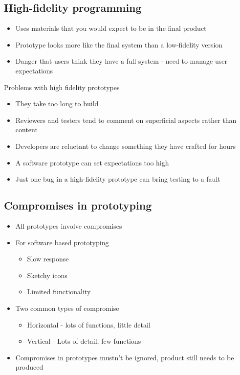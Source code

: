 \documentclass{article}[18pt]
\begin{document}
\subsection{High-fidelity programming}
\begin{itemize}
	\item Uses materials that you would expect to be in the final product
	\item Prototype looks more like the final system than a low-fidelity version
	\item Danger that users think they have a full system - need to manage user expectations
\end{itemize}
Problems with high fidelity prototypes
\begin{itemize}
	\item They take too long to build
	\item Reviewers and testers tend to comment on superficial aspects rather than content
	\item Developers are reluctant to change something they have crafted for hours
	\item A software prototype can set expectations too high
	\item Just one bug in a high-fidelity prototype can bring testing to a fault
\end{itemize}
\subsection{Compromises in prototyping}
\begin{itemize}
	\item All prototypes involve compromises
	\item For software based prototyping
	\begin{itemize}
		\item Slow response
		\item Sketchy icons
		\item Limited functionality
	\end{itemize}
	\item Two common types of compromise
	\begin{itemize}
		\item Horizontal - lots of functions, little detail
		\item Vertical - Lots of detail, few functions
	\end{itemize}
	\item Compromises in prototypes mustn't be ignored, product still needs to be produced
\end{itemize}
\end{document}
